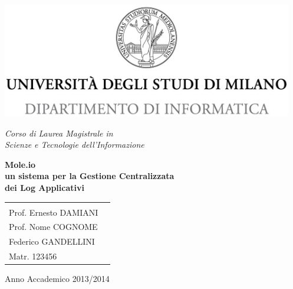 \begin{titlepage}
  \begin{center}
    \includegraphics[height=5.0cm]{img/minerva_2013_DI.jpg}
    
    \vspace*{.4cm}
    {\Large 
      \emph{Corso di Laurea Magistrale in\\[.3cm]
        Scienze e Tecnologie dell'Informazione}
    }
    \vfill
    \begin{LARGE}
      \textbf{Mole.io\\[0.4cm]
        un sistema per la Gestione Centralizzata\\[0.6cm]
        dei Log Applicativi}
    \end{LARGE}
    
    \vfill
    \begin{minipage}{.99\linewidth}
      \begin{tabular}{l r}
        \begin{minipage}{.4\linewidth}
          \begin{flushleft}
            {\large
              RELATORE\\[.3cm]
              Prof. Ernesto DAMIANI
            }
            
            \vspace*{1.5cm}
            {\large
              CORRELATORE\\[.3cm]
              Prof. Nome COGNOME
            }
          \end{flushleft}
        \end{minipage}
        &
        \begin{minipage}{.6\linewidth}
          \begin{flushright}
            {\large
              TESI DI LAUREA DI\\[.3cm]
              Federico GANDELLINI\\[.45cm]
              Matr. 123456
            }
          \end{flushright}
        \end{minipage}
      \end{tabular}
    \end{minipage}
    
    \vfill
    {\large{{Anno Accademico 2013/2014}}}
  \end{center}
\end{titlepage}
